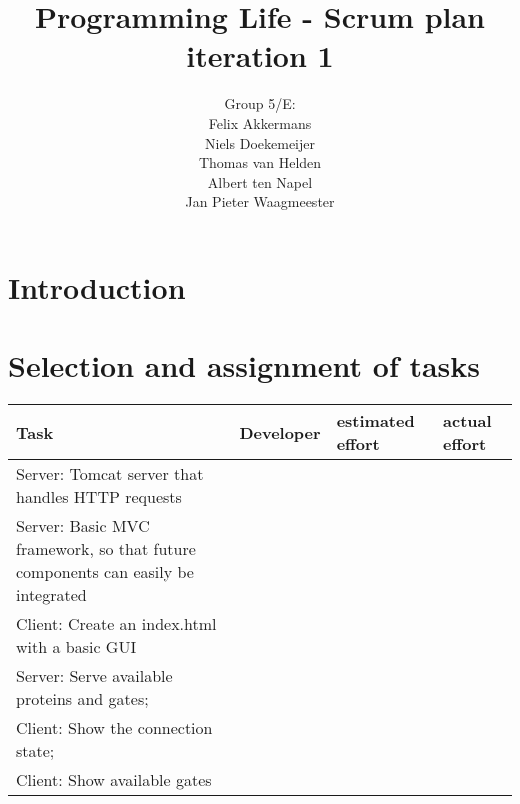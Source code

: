 \documentclass[a4paper]{article}
\title{Programming Life - Scrum plan iteration 1}
\author{Group 5/E:\\
Felix Akkermans \\
Niels Doekemeijer \\
Thomas van Helden \\
Albert ten Napel \\
Jan Pieter Waagmeester}
\begin{document}
\maketitle

\section{Introduction}

\section{Selection and assignment of tasks}

\begin{tabularx}{\textwidth}{p{9cm} l p{1.4cm}p{1.2cm}}
Task & Developer & estimated effort & actual effort \\
\hline
Server: Tomcat server that handles HTTP requests & & & \\
Server: Basic MVC framework, so that future components can easily be integrated & & & \\
Client: Create an index.html with a basic GUI & & & \\
Server: Serve available proteins and gates; & & & \\
Client: Show the connection state; & & & \\
Client: Show available gates & & & \\ \hline


\end{tabularx}

\end{document}
